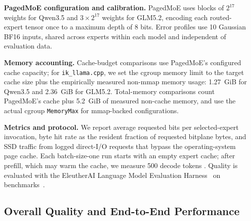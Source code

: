 \documentclass[sigconf, nonacm]{acmart}
\begin{document}
\noindent\textbf{PagedMoE configuration and calibration.}
PagedMoE uses blocks of \(2^{17}\) weights for Qwen3.5 and
\(3\times2^{17}\) weights for GLM5.2, encoding each routed-expert
tensor once to a maximum depth of 8 bits. Error profiles use 10
Gaussian BF16 inputs, shared across experts within
each model and independent of evaluation data.

\noindent\textbf{Memory accounting.}
Cache-budget comparisons use PagedMoE's configured cache capacity; for \texttt{ik\_llama.cpp}, we set the cgroup memory limit to the target cache size plus the empirically measured non-mmap memory usage: 1.27~GiB for Qwen3.5 and 2.36~GiB for GLM5.2. Total-memory comparisons count PagedMoE's
cache plus 5.2~GiB of measured non-cache memory, and use the actual
cgroup \texttt{MemoryMax} for mmap-backed configurations.

\noindent\textbf{Metrics and protocol.}
We report average requested bits per selected-expert invocation, byte
hit rate as the resident fraction of requested bitplane bytes, and SSD
traffic from logged direct-I/O requests that bypass the operating-system
page cache. Each batch-size-one run starts with an empty expert cache;
after prefill, which may warm the cache, we measure 500 decode tokens%
. Quality is evaluated with the
EleutherAI Language Model Evaluation Harness~\cite{lm_eval_harness}
on benchmarks~\cite{gsm8k,openbookqa,arc,winogrande,gpqa,wikitext2}.


\subsection{Overall Quality and End-to-End Performance}
\label{sec:eval-overall}
\end{document}
